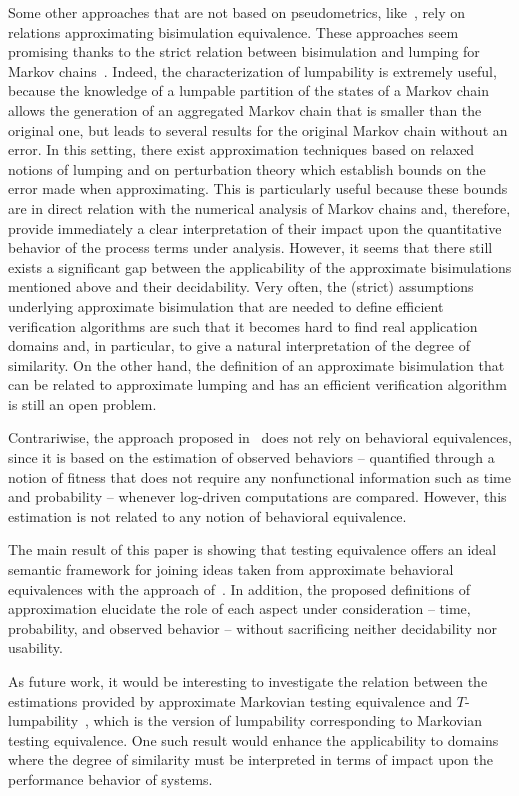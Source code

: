 \documentclass[copyright,creativecommons]{eptcs}
\begin{document}
Some other approaches that are not based on pseudometrics, like~\cite{AP,DLT,DHW2}, rely on relations approximating 
bisimulation equivalence. 
These approaches seem promising thanks to the strict relation between bisimulation and lumping for Markov chains~\cite{Buc}. 
Indeed, the characterization of lumpability is extremely useful, because the knowledge of a lumpable partition of the states 
of a Markov chain allows the generation of an aggregated Markov chain that is smaller than the original one, but leads to 
several results for the original Markov chain without an error. In this setting, there exist approximation techniques based 
on relaxed notions of lumping and on perturbation theory which establish bounds on the error made when approximating. This is 
particularly useful because these bounds are in direct relation with the numerical analysis of Markov chains and, therefore, 
provide immediately a clear interpretation of their impact upon the quantitative behavior of the process terms under analysis. 
However, it seems that there still exists a significant gap between the applicability of the approximate bisimulations 
mentioned above and their decidability. Very often, the (strict) assumptions underlying approximate bisimulation that are needed 
to define efficient verification algorithms are such that it becomes hard to find real application domains and, in particular, 
to give a natural interpretation of the degree of similarity. 
On the other hand, the definition of an approximate bisimulation that can be related to approximate lumping and has an efficient 
verification algorithm is still an open problem.

Contrariwise, the approach proposed in~\cite{AAW} does not rely on behavioral equivalences, since it is based on the estimation
of observed behaviors -- quantified through a notion of fitness that does not require any nonfunctional information such as time 
and probability -- whenever log-driven computations are compared. However, this estimation is not related to any notion of
behavioral equivalence.

The main result of this paper is showing that testing equivalence offers an ideal semantic framework for joining ideas
taken from approximate behavioral equivalences with the approach of~\cite{AAW}. In addition, the proposed definitions of 
approximation elucidate the role of each aspect under consideration -- time, probability, and observed behavior -- without 
sacrificing neither decidability nor usability. 

As future work, it would be interesting to investigate the relation between the estimations provided by approximate 
Markovian testing equivalence and $T$-lumpability~\cite{ABC}, which is the version of lumpability corresponding to Markovian 
testing equivalence. One such result would enhance the applicability to domains where the degree of similarity must be 
interpreted in terms of impact upon the performance behavior of systems.
\end{document}
